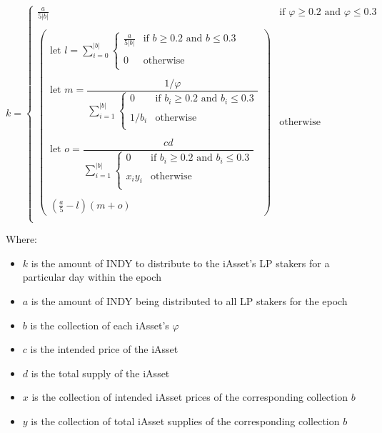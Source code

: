 \documentclass{article}
\begin{document}
\begin{sloppypar}
\[k = \left\{ \begin{matrix}
  \frac{a}{5\left|b\right|} & \text{if\ }\varphi \geq 0.2\text{\ and\ }\varphi \leq 0.3 \\ \\
  \begin{pmatrix}
    \text{let\ }l = \sum_{i=0}^{\left| b \right|}\left\{\begin{matrix}
    \frac{a}{5\left|b\right|} & \text{if\ }b\geq 0.2 \text{\ and\ }b \leq 0.3         \\ \\
    0           & \text{otherwise}                                      \\
    \end{matrix}\right. \\ \\
    \text{let\ }m = \dfrac{1 / \varphi}{\sum_{i = 1}^{\left| b \right|}\left\{ \begin{matrix}
    0           & \text{if\ }b_{i} \geq 0.2\text{\ and\ }b_{i} \leq 0.3 \\ \\
    1 / b_{i}   & \text{otherwise}                                      \\
    \end{matrix} \right.}\\ \\
    \text{let\ }o = \dfrac{cd}{\sum_{i = 1}^{\left| b \right|}\left\{ \begin{matrix}
    0           & \text{if\ }b_{i} \geq 0.2\text{\ and\ }b_{i} \leq 0.3 \\ \\
    x_{i}y_{i}  & \text{otherwise}                                      \\
    \end{matrix} \right.} \\ \\
    \left( \frac{a}{5} - l\right) \left( m + o \right)
  \end{pmatrix} & \text{otherwise} \\
  \end{matrix} \right.\]

Where:

\begin{itemize}
\item
  \(k\) is the amount of INDY to distribute to the iAsset's LP stakers
  for a particular day within the epoch
\item
  \(a\) is the amount of INDY being distributed to all LP stakers for
  the epoch
\item
  \(b\) is the collection of each iAsset's \(\varphi\)
\item
  \(c\) is the intended price of the iAsset
\item
  \(d\) is the total supply of the iAsset
\item
  \(x\) is the collection of intended iAsset prices of the corresponding
  collection \(b\)
\item
  \(y\) is the collection of total iAsset supplies of the corresponding
  collection \(b\)
\end{itemize}


\end{sloppypar}
\end{document}
